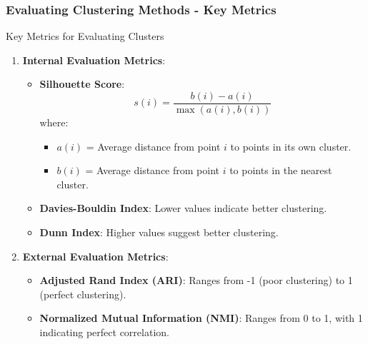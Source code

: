 \documentclass[aspectratio=169]{beamer}
\begin{document}
\begin{frame}[fragile]
    \frametitle{Evaluating Clustering Methods - Key Metrics}
    
    \begin{block}{Key Metrics for Evaluating Clusters}
        \begin{enumerate}
            \item \textbf{Internal Evaluation Metrics}:
                \begin{itemize}
                    \item \textbf{Silhouette Score}:
                        \begin{equation}
                        s(i) = \frac{b(i) - a(i)}{\max(a(i), b(i))}
                        \end{equation}
                        where:
                        \begin{itemize}
                            \item \(a(i)\) = Average distance from point \(i\) to points in its own cluster.
                            \item \(b(i)\) = Average distance from point \(i\) to points in the nearest cluster.
                        \end{itemize}
                    \item \textbf{Davies-Bouldin Index}: Lower values indicate better clustering.
                    \item \textbf{Dunn Index}: Higher values suggest better clustering.
                \end{itemize}
            \item \textbf{External Evaluation Metrics}:
                \begin{itemize}
                    \item \textbf{Adjusted Rand Index (ARI)}: Ranges from -1 (poor clustering) to 1 (perfect clustering).
                    \item \textbf{Normalized Mutual Information (NMI)}: Ranges from 0 to 1, with 1 indicating perfect correlation.
                \end{itemize}
        \end{enumerate}
    \end{block}
\end{frame}
\end{document}
